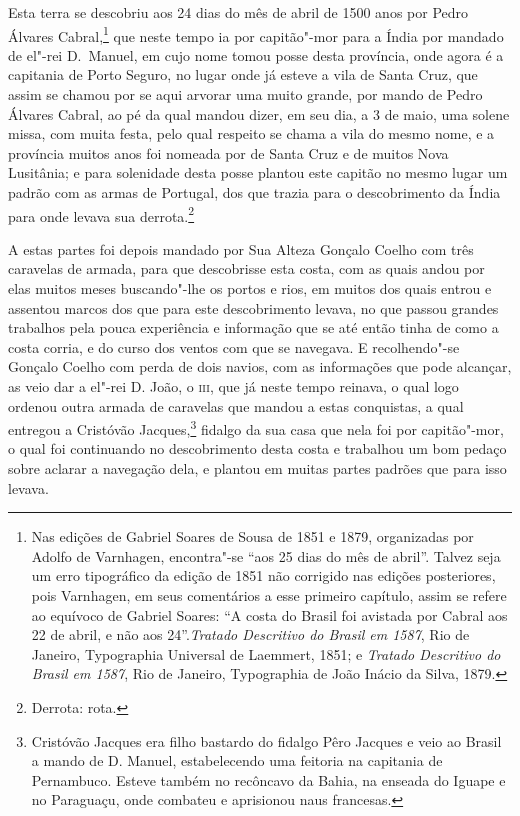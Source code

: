 \begin{linenumbers}
Esta terra se descobriu aos 24 dias do mês de abril de 1500 anos por Pedro Álvares
Cabral,\footnote{ Nas edições de Gabriel Soares de Sousa de 1851 e 1879, organizadas por
Adolfo de Varnhagen, encontra"-se ``aos 25 dias do mês de abril''. Talvez seja um erro
tipográfico da edição de 1851 não corrigido nas edições posteriores, pois Varnhagen, em
seus comentários a esse primeiro capítulo, assim se refere ao equívoco de Gabriel Soares:
``A costa do Brasil foi avistada por Cabral aos 22 de abril, e não aos
24''.\textit{Tratado Descritivo do Brasil em 1587}, Rio de Janeiro, Typographia Universal
de Laemmert, 1851; e \textit{Tratado Descritivo do Brasil em 1587}, Rio de Janeiro,
Typographia de João Inácio da Silva, 1879.}
que neste tempo ia por capitão"-mor para a Índia por mandado de el"-rei D.~Manuel, em cujo
nome tomou posse desta província, onde agora é a capitania de Porto Seguro, no lugar onde
já esteve a vila de Santa Cruz, que assim se chamou por se aqui arvorar uma muito grande,
por mando de Pedro Álvares Cabral, ao pé da qual mandou dizer, em seu dia, a 3 de maio,
uma solene missa, com muita festa, pelo qual respeito se chama a vila do mesmo nome, e a
província muitos anos foi nomeada por de Santa Cruz e de muitos Nova Lusitânia; e para
solenidade desta posse plantou este capitão no mesmo lugar um padrão com as armas de
Portugal, dos que trazia para o descobrimento da Índia para onde levava sua derrota.\footnote{
Derrota: rota.}

A estas partes foi depois mandado por Sua Alteza Gonçalo Coelho com três caravelas de
armada, para que descobrisse esta costa, com as quais andou por elas muitos meses
buscando"-lhe os portos e rios, em muitos dos quais entrou e assentou marcos dos que para
este descobrimento levava, no que passou grandes trabalhos pela pouca experiência e
informação que se até então tinha de como a costa corria, e do curso dos ventos com que se
navegava. E recolhendo"-se Gonçalo Coelho com perda de dois navios, com as informações que
pode alcançar, as veio dar a el"-rei D. João, o \textsc{iii}, que já neste tempo reinava, o
qual logo ordenou outra armada de caravelas que mandou a estas conquistas, a qual entregou
a Cristóvão Jacques,\footnote{ Cristóvão Jacques era filho bastardo do fidalgo Pêro
Jacques e veio ao Brasil a mando de D. Manuel, estabelecendo uma feitoria na capitania de
Pernambuco. Esteve também no recôncavo da Bahia, na enseada do Iguape e no Paraguaçu, onde
combateu e aprisionou naus francesas.} fidalgo da sua casa que nela foi por capitão"-mor, o
qual foi continuando no descobrimento desta costa e trabalhou um bom pedaço sobre aclarar
a navegação dela, e plantou em muitas partes padrões que para isso levava.


\end{linenumbers}
